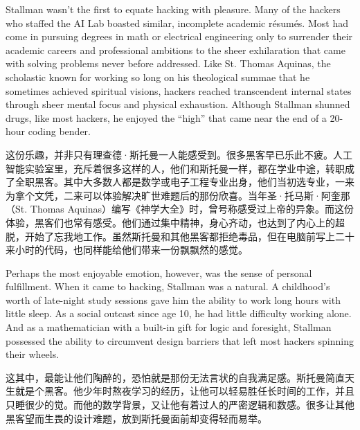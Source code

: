 \ifdefined\eng
Stallman wasn't the first to equate hacking with pleasure. Many of the hackers who staffed the AI Lab boasted similar, incomplete academic résumés. Most had come in pursuing degrees in math or electrical engineering only to surrender their academic careers and professional ambitions to the sheer exhilaration that came with solving problems never before addressed. Like St. Thomas Aquinas, the scholastic known for working so long on his theological summae that he sometimes achieved spiritual visions, hackers reached transcendent internal states through sheer mental focus and physical exhaustion. Although Stallman shunned drugs, like most hackers, he enjoyed the ``high'' that came near the end of a 20-hour coding bender.
\fi

\ifdefined\chs
这份乐趣，并非只有理查德·斯托曼一人能感受到。很多黑客早已乐此不疲。人工智能实验室里，充斥着很多这样的人，他们和斯托曼一样，都在学业中途，转职成了全职黑客。其中大多数人都是数学或电子工程专业出身，他们当初选专业，一来为拿个文凭，二来可以体验解决旷世难题后的那份欣喜。当年圣·托马斯·阿奎那（St. Thomas Aquinas）编写《神学大全》时，曾号称感受过上帝的异象。而这份体验，黑客们也常有感受。他们通过集中精神，身心齐动，也达到了内心上的超脱，开始了忘我地工作。虽然斯托曼和其他黑客都拒绝毒品，但在电脑前写上二十来小时的代码，也同样能给他们带来一份飘飘然的感觉。
\fi

\ifdefined\eng
Perhaps the most enjoyable emotion, however, was the sense of personal fulfillment. When it came to hacking, Stallman was a natural. A childhood's worth of late-night study sessions gave him the ability to work long hours with little sleep. As a social outcast since age 10, he had little difficulty working alone. And as a mathematician with \ifdefined\vtwo a \fi built-in gift for logic and foresight, Stallman possessed the ability to circumvent design barriers that left most hackers spinning their wheels.
\fi

\ifdefined\chs
这其中，最能让他们陶醉的，恐怕就是那份无法言状的自我满足感。斯托曼简直天生就是个黑客。他少年时熬夜学习的经历，让他可以轻易胜任长时间的工作，并且只睡很少的觉。而他的数学背景，又让他有着过人的严密逻辑和数感。很多让其他黑客望而生畏的设计难题，放到斯托曼面前却变得轻而易举。
\fi

